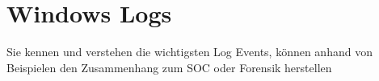 

\section{Windows Logs}

Sie kennen und verstehen die wichtigsten Log Events, können anhand von Beispielen den Zusammenhang zum SOC
oder Forensik herstellen